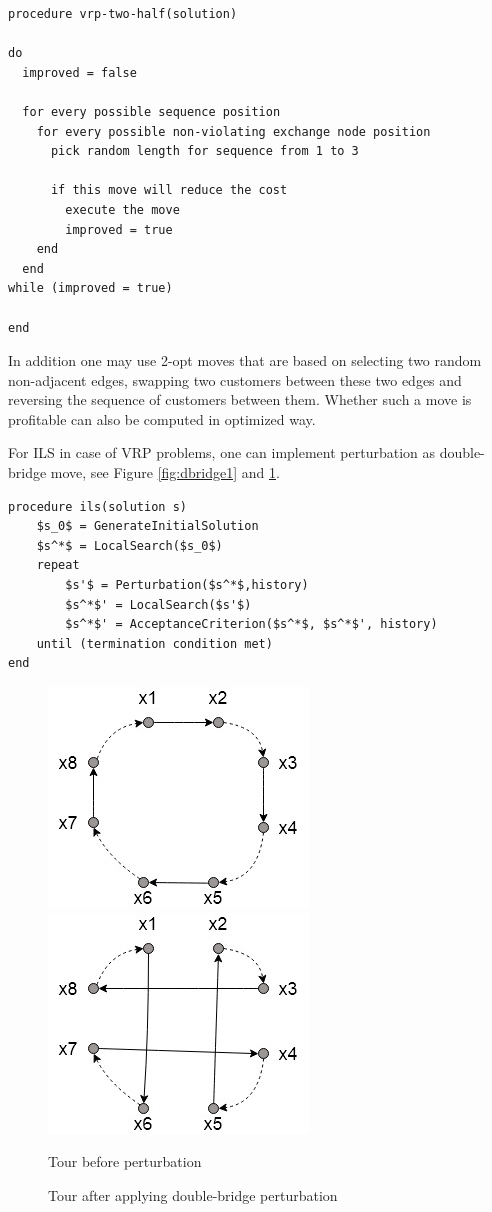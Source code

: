 \documentclass[11pt,a4paper,oneside]{book}
\begin{document}
\begin{minipage}[c, breaklines=true]{0.95\textwidth}
\begin{lstlisting}[caption={2.5-opt pseudo-code for VRP problems}, label={lst:vrp-two-half}]
procedure vrp-two-half(solution)

do
  improved = false
  
  for every possible sequence position
    for every possible non-violating exchange node position
      pick random length for sequence from 1 to 3
    
      if this move will reduce the cost
        execute the move
        improved = true
    end
  end
while (improved = true)

end
\end{lstlisting}
\end{minipage}

In addition one may use 2-opt moves that are based on selecting two random non-adjacent edges, swapping two customers between these two edges and reversing the sequence of customers between them. Whether such a move is profitable can also be computed in optimized way.

For ILS in case of VRP problems, one can implement perturbation as double-bridge move, see Figure \ref{fig:dbridge1} and \ref{fig:dbridge2}.

\begin{minipage}[c, breaklines=true]{0.95\textwidth}
\begin{lstlisting}[caption={Iterated Local Search outline}, label={lst:ils},mathescape]
procedure ils(solution s)
	$s_0$ = GenerateInitialSolution
	$s^*$ = LocalSearch($s_0$)
	repeat
		$s'$ = Perturbation($s^*$,history)
		$s^*$' = LocalSearch($s'$)
		$s^*$' = AcceptanceCriterion($s^*$, $s^*$', history)
	until (termination condition met)
end
\end{lstlisting}
\end{minipage}


\begin{multicols}{2}
\begin{figure}[ht!]
\includegraphics[width=.3\textwidth]{double-bridge/1.jpg}\hfill
\includegraphics[width=.3\textwidth]{double-bridge/2.jpg}
\caption{Tour before perturbation} \label{fig:dbridge1}
\caption{Tour after applying double-bridge perturbation} \label{fig:dbridge2}
\end{figure}
\end{multicols}
\end{document}
